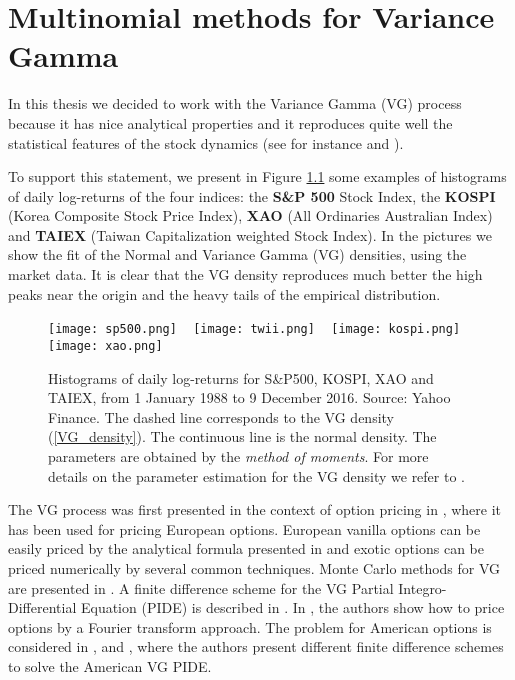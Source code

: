 

\chapter{Multinomial methods for Variance Gamma}\label{Chapter3}
\minitoc%

\vspace{5em}


 
 
In this thesis we decided to work with the Variance Gamma (VG) process because it has nice analytical properties and 
it reproduces quite well the statistical features of the stock dynamics (see for instance \cite{Cont} and \cite{Ait12}).

To support this statement, 
we present in Figure \ref{FigPDF} some examples of histograms of
daily log-returns of the four indices:  
the \textbf{S\&P 500} Stock Index, 
the \textbf{KOSPI} (Korea Composite Stock Price Index), 
\textbf{XAO} (All Ordinaries Australian Index)  
and \textbf{TAIEX} (Taiwan Capitalization weighted Stock Index).
In the pictures we show the fit of the Normal and Variance Gamma (VG) densities, using the market data. 
It is clear that the 
VG density reproduces much better the high peaks near the origin and the heavy tails of the empirical distribution.

\begin{figure}[t!]
 \centering
 \texttt{[image: sp500.png]}
 ~
 \texttt{[image: twii.png]}
 ~
 \texttt{[image: kospi.png]}
 ~
 \texttt{[image: xao.png]}
 \caption{Histograms of daily log-returns for S\&P500, KOSPI, XAO and TAIEX, from 1 January 1988 to 9 December 2016. Source: Yahoo Finance.
 The dashed line corresponds to the VG density (\ref{VG_density}). 
 The continuous line is the normal density. 
 The parameters are obtained by the \emph{method of moments}. For more details on the parameter estimation for the VG density we refer to \cite{Se04}.}
 \label{FigPDF}
\end{figure} 

The VG process was first presented in the context of option pricing 
in \cite{MaMi91}, where it has been used for pricing European options.
European vanilla options can be easily priced by the analytical formula presented in \cite{MCC98} and exotic options
can be priced numerically by several common techniques.
Monte Carlo methods for VG are presented in \cite{Fu00}. 
A finite difference scheme for the VG Partial Integro-Differential Equation (PIDE) 
is described in \cite{CoVo05b}. In \cite{CaMa98}, the authors show how to price options by a Fourier transform approach.
The problem for American options is considered in \cite{Al05}, \cite{Oo05} and \cite{HiMa01}, where the authors present different finite difference 
schemes to solve the American VG PIDE.

